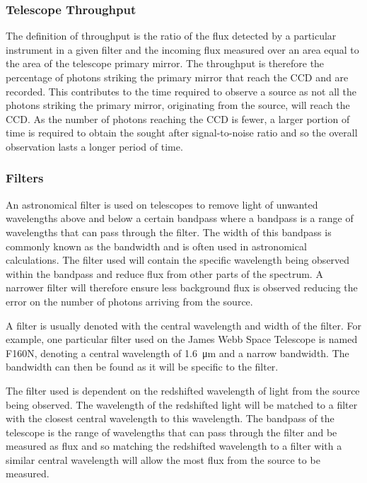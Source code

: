 		\subsubsection{Telescope Throughput} %
		\label{ssub:telescope_throughput}
			The definition of throughput is the ratio of the flux detected by a particular instrument in a given filter and the incoming flux measured over an area equal to the area of the telescope primary mirror\cite{WIRCam_Throughput}. The throughput is therefore the percentage of photons striking the primary mirror that reach the CCD and are recorded. This contributes to the time required to observe a source as not all the photons striking the primary mirror, originating from the source, will reach the CCD. As the number of photons reaching the CCD is fewer, a larger portion of time is required to obtain the sought after signal-to-noise ratio and so the overall observation lasts a longer period of time.

		\subsubsection{Filters} %
		\label{ssub:filters}
			An astronomical filter is used on telescopes to remove light of unwanted wavelengths above and below a certain bandpass where a bandpass is a range of wavelengths that can pass through the filter. The width of this bandpass is commonly known as the bandwidth and is often used in astronomical calculations. The filter used will contain the specific wavelength being observed within the bandpass and reduce flux from other parts of the spectrum. A narrower filter will therefore ensure less background flux is observed reducing the error on the number of photons arriving from the source.

			A filter is usually denoted with the central wavelength and width of the filter. For example, one particular filter used on the James Webb Space Telescope is named F160N, denoting a central wavelength of \SI{1.6}{\micro\metre} and a narrow bandwidth. The bandwidth can then be found as it will be specific to the filter.

			The filter used is dependent on the redshifted wavelength of light from the source being observed. The wavelength of the redshifted light will be matched to a filter with the closest central wavelength to this wavelength. The bandpass of the telescope is the range of wavelengths that can pass through the filter and be measured as flux and so matching the redshifted wavelength to a filter with a similar central wavelength will allow the most flux from the source to be measured.

